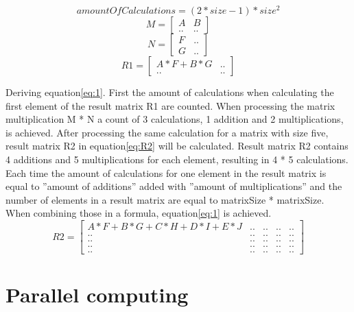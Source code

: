 \documentclass[12pt,a4paper,english,twoside,openright]{tutthesis}
\begin{document}
\begin{equation} \label{eq:1}
amountOfCalculations = (2*size-1)*size^2
\end{equation}
\begin{equation}
	M =	\begin{bmatrix}
	A & B \\[0.2em]
	.. & ..
	\end{bmatrix}
\end{equation}
\begin{equation}
	N =	\begin{bmatrix}
	F & .. \\[0.2em]
	G & ..
	\end{bmatrix}
\end{equation}
\begin{equation} \label{eq:R1}
	R1 =	\begin{bmatrix}
	A*F+B*G & .. \\[0.2em]
	.. & ..
	\end{bmatrix}
\end{equation}

Deriving equation\ref{eq:1}. First the amount of calculations when calculating the first element of the result matrix R1 are counted. When processing the matrix multiplication M * N a count of 3 calculations, 1 addition and 2 multiplications, is achieved. After processing the same calculation for a matrix with size five, result matrix R2 in equation\ref{eq:R2} will be calculated. Result matrix R2 contains 4 additions and 5 multiplications for each element, resulting in 4 * 5 calculations. Each time the amount of calculations for one element in the result matrix is equal to ''amount of additions'' added with ''amount of multiplications'' and the number of elements in a result matrix are equal to matrixSize * matrixSize. When combining those in a formula, equation\ref{eq:1} is achieved.
\begin{equation}\label{eq:R2}
	R2 =	\begin{bmatrix}
	A*F+B*G+C*H+D*I+E*J & .. & .. & .. & .. \\[0.5em]
	.. & .. & .. & .. & .. \\[0.5em]
	.. & .. & .. & .. & .. \\[0.5em]
	.. & .. & .. & .. & .. \\[0.5em]
	.. & .. & .. & .. & ..
	\end{bmatrix}
\end{equation}
	\section{Parallel computing}
	
\end{document}
